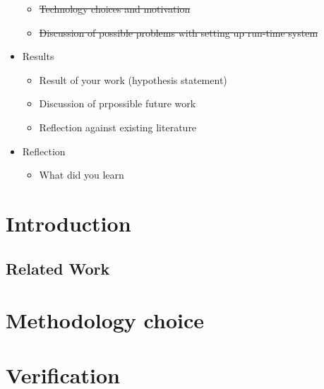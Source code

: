 \documentclass[journal,10pt]{IEEEtran}
\begin{document}
\begin{itemize}
\begin{itemize}
    \item \st{Technology choices and motivation}
    \item \st{Discussion of possible problems with setting up run-time system}
  \end{itemize}
  \item Results
  \begin{itemize}
    \item Result of your work (hypothesis statement)
    \item Discussion of prpossible future work
    \item Reflection against existing literature
  \end{itemize}
  \item Reflection
  \begin{itemize}
    \item What did you learn
  \end{itemize}
\end{itemize}


\section{Introduction}


\subsection{Related Work}


\section{Methodology choice}


\section{Verification}


\end{document}
